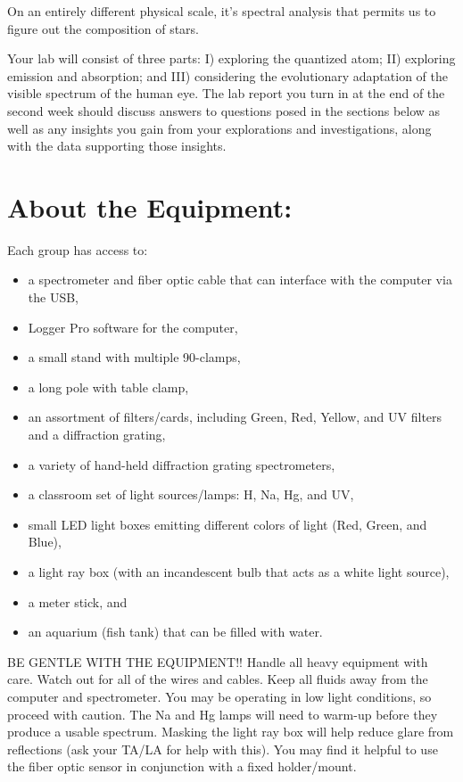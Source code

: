 On an entirely different physical scale, it's spectral analysis that permits us to figure out the composition of stars. 
\par 
Your lab will consist of three parts: I) exploring the quantized atom; II) exploring emission and absorption; and III) considering the evolutionary adaptation of the visible spectrum of the human eye. 
The lab report you turn in at the end of the second week should discuss answers to questions posed in the sections below as well as any insights you gain from your explorations and investigations, along with the data supporting those insights.

\section*{About the Equipment:}
Each group has access to:
\begin{itemize}
\item a spectrometer and fiber optic cable that can interface with the computer via the USB,
\item Logger Pro software for the computer,
\item a small stand with multiple 90-clamps,
\item a long pole with table clamp,
\item an assortment of filters/cards, including Green, Red, Yellow, and UV filters and a diffraction grating,
\item a variety of hand-held diffraction grating spectrometers,
\item a classroom set of light sources/lamps: H, Na, Hg, and UV,
\item small LED light boxes emitting different colors of light (Red, Green, and Blue),
\item a light ray box (with an incandescent bulb that acts as a white light source),
\item a meter stick, and
\item an aquarium (fish tank) that can be filled with water.
\end{itemize}
BE GENTLE WITH THE EQUIPMENT!! 
Handle all heavy equipment with care. 
Watch out for all of the wires and cables. 
Keep all fluids away from the computer and spectrometer.
You may be operating in low light conditions, so proceed with caution. 
The Na and Hg lamps will need to warm-up before they produce a usable spectrum. 
Masking the light ray box will help reduce glare from reflections (ask your TA/LA for help with this). 
You may find it helpful to use the fiber optic sensor in conjunction with a fixed holder/mount.

